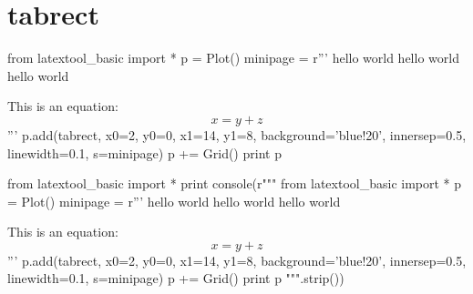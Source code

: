 \section{tabrect}

\begin{python}
from latextool_basic import *
p = Plot()
minipage = r'''
hello world hello world hello world

This is an equation:
\[
x = y + z
\]
'''
p.add(tabrect, x0=2, y0=0, x1=14, y1=8, background='blue!20',
      innersep=0.5, linewidth=0.1, s=minipage)
p += Grid()
print p
\end{python}
\begin{python}
from latextool_basic import *
print console(r"""
from latextool_basic import *
p = Plot()
minipage = r'''
hello world hello world hello world

This is an equation:
\[
x = y + z
\]
'''
p.add(tabrect, x0=2, y0=0, x1=14, y1=8, background='blue!20',
      innersep=0.5, linewidth=0.1, s=minipage)
p += Grid()
print p
""".strip())
\end{python}
